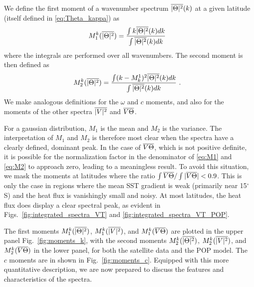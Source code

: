 \documentclass[10pt]{article}
\newcommand{\ol}{\ensuremath{\overline}}
\begin{document}
We define the first moment of a wavenumber spectrum $\ol{|\Theta|^2}(k)$ at a given latitude (itself defined in \ref{eq:Theta_kappa}) as
\begin{equation}
M^k_1 ( \ol{|\Theta|^2} ) = \frac{ \int k \ol{|\Theta|^2}(k) d k }{ \int \ol{|\Theta|^2}(k) d k }
\label{eq:M1}
\end{equation}
where the integrals are performed over all wavenumbers. The second moment is then defined as
\begin{equation}
M^k_2 (\ol{ |\Theta|^2 }) = \frac{ \int (k - M^1_k)^2 \ol{|\Theta|^2}(k) d k }{ \int \ol{|\Theta|^2}(k) d k } \ .
\label{eq:M2}
\end{equation}
We make analogous definitions for the $\omega$ and $c$ moments, and also for the moments of the other spectra $\ol{|V|^2}$ and $\ol{V \Theta}$. 

For a gaussian distribution, $M_1$ is the mean and $M_2$ is the variance. The interpretation of $M_1$ and $M_2$ is therefore most clear when the spectra have a clearly defined, dominant peak. In the case of $\ol{V \Theta}$,  which is not positive definite, it is possible for the normalization factor in the denominator of \eqref{eq:M1} and \eqref{eq:M2} to approach zero, leading to a meaningless result. To avoid this situation, we mask the moments at latitudes where the ratio $\int \ol{V\Theta} / \int | \ol{V \Theta} | < 0.9$. This is only the case in regions where the mean SST gradient is weak (primarily near 15$^\circ$S) and the heat flux is vanishingly small and noisy. At most latitudes, the heat flux does display a clear spectral peak, as evident in Figs.~\ref{fig:integrated_spectra_VT} and \ref{fig:integrated_spectra_VT_POP}.

The first moments $M_1^k( \ol{|\Theta|^2} )$, $M_1^k( \ol{|V|^2} )$, and $M_1^k( \ol{V \Theta} )$ are plotted in the upper panel Fig.~\ref{fig:moments_k}, with the second moments $M_2^k( \ol{|\Theta|^2} )$, $M_2^k( \ol{|V|^2} )$, and $M_2^k( \ol{V \Theta} )$ in the lower panel, for both the satellite data and the POP model. The $c$ moments are in shown in Fig.~\ref{fig:moments_c}. Equipped with this more quantitative description, we are now prepared to discuss the features and characteristics of the spectra.
\end{document}
